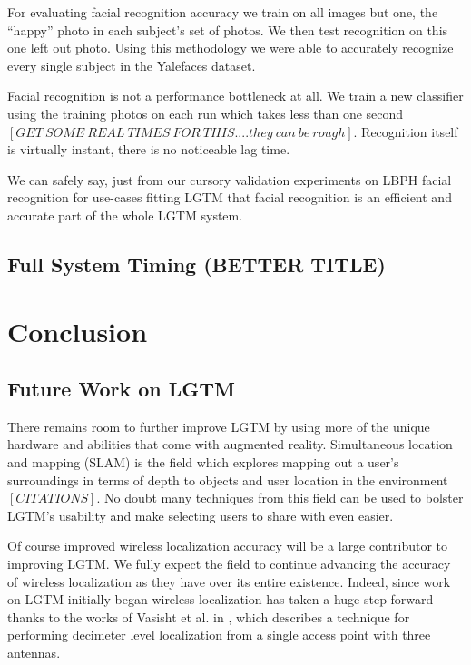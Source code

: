 \documentclass[12pt]{report}
\begin{document}
For evaluating facial recognition accuracy we train on all images but one, the ``happy'' photo in each subject's set of photos. We then test recognition on this one left out photo. Using this methodology we were able to accurately recognize every single subject in the Yalefaces dataset. \par

Facial recognition is not a performance bottleneck at all. We train a new classifier using the training photos on each run which takes less than one second $[GET \: SOME \: REAL \: TIMES \: FOR \: THIS....they \: can \: be \: rough]$. Recognition itself is virtually instant, there is no noticeable lag time. \par

We can safely say, just from our cursory validation experiments on LBPH facial recognition for use-cases fitting LGTM that facial recognition is an efficient and accurate part of the whole LGTM system. \par

\section{Full System Timing (BETTER TITLE)}


\chapter{Conclusion}
\section{Future Work on LGTM}
There remains room to further improve LGTM by using more of the unique hardware and abilities that come with augmented reality. Simultaneous location and mapping (SLAM) is the field which explores mapping out a user's surroundings in terms of depth to objects and user location in the environment $[CITATIONS]$. No doubt many techniques from this field can be used to bolster LGTM's usability and make selecting users to share with even easier. \par

Of course improved wireless localization accuracy will be a large contributor to improving LGTM. We fully expect the field to continue advancing the accuracy of wireless localization as they have over its entire existence. Indeed, since work on LGTM initially began wireless localization has taken a huge step forward thanks to the works of Vasisht et al. in \cite{ChronosSingleAPLocalizationVasisht2016}, which describes a technique for performing decimeter level localization from a single access point with three antennas. \par
\end{document}
